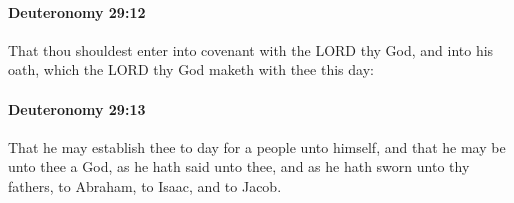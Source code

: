 		\paragraph{Deuteronomy 29:12} %
			\label{DEUTERONOMY-29-12}

			That thou shouldest enter into covenant with the LORD thy God, and into his oath, which the LORD thy God maketh with thee this day:


		\paragraph{Deuteronomy 29:13} %
			\label{DEUTERONOMY-29-13}

			That he may establish thee to day for a people unto himself, and that he may be unto thee a God, as he hath said unto thee, and as he hath sworn unto thy fathers, to Abraham, to Isaac, and to Jacob.


